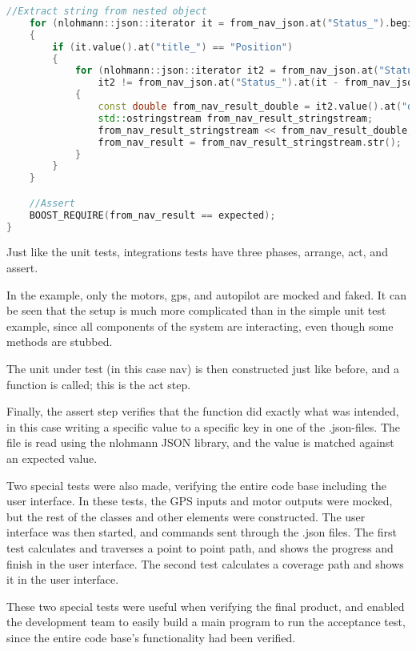 \begin{lstlisting}[caption = {ReceiveNavigationTransmitter_test}, captionpos=b, label={lst:software_integration_test}, language=C++,firstnumber=1]
	//Extract string from nested object
	for (nlohmann::json::iterator it = from_nav_json.at("Status_").begin(); it != from_nav_json.at("Status_").end(); ++it)
	{
		if (it.value().at("title_") == "Position")
		{
			for (nlohmann::json::iterator it2 = from_nav_json.at("Status_").at(it - from_nav_json.at("Status_").begin()).at("items_") .begin();
				it2 != from_nav_json.at("Status_").at(it - from_nav_json.at("Status_").begin()) .at("items_").end(); ++it2)
			{
				const double from_nav_result_double = it2.value().at("data_");
				std::ostringstream from_nav_result_stringstream;
				from_nav_result_stringstream << from_nav_result_double;
				from_nav_result = from_nav_result_stringstream.str();
			}
		}
	}

	//Assert
	BOOST_REQUIRE(from_nav_result == expected);
}
\end{lstlisting}

Just like the unit tests, integrations tests have three phases, arrange, act, and assert. 

In the example, only the motors, gps, and autopilot are mocked and faked. It can be seen that the setup is much more complicated than in the simple unit test example, since all components of the system are interacting, even though some methods are stubbed.

The unit under test (in this case nav) is then constructed just like before, and a function is called; this is the act step. 

Finally, the assert step verifies that the function did exactly what was intended, in this case writing a specific value to a specific key in one of the .json-files. The file is read using the nlohmann JSON library, and the value is matched against an expected value.

Two special tests were also made, verifying the entire code base including the user interface. In these tests, the GPS inputs and motor outputs were mocked, but the rest of the classes and other elements were constructed. The user interface was then started, and commands sent through the .json files. The first test calculates and traverses a point to point path, and shows the progress and finish in the user interface. The second test calculates a coverage path and shows it in the user interface.

These two special tests were useful when verifying the final product, and enabled the development team to easily build a main program to run the acceptance test, since the entire code base's functionality had been verified.